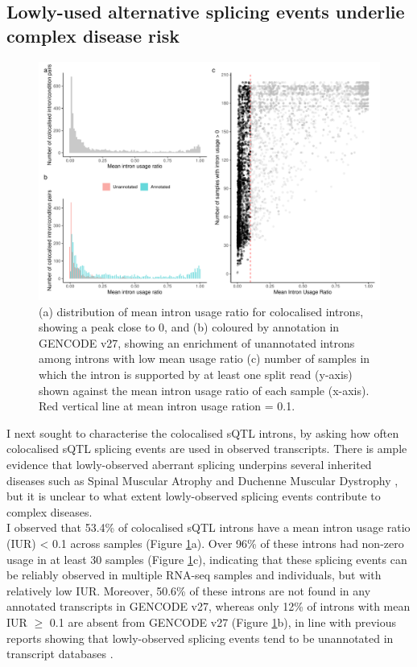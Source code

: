 \subsection{Lowly-used alternative splicing events underlie complex disease risk}
\begin{figure}[H]
  \centering
  \includegraphics[width=\textwidth]{low_sj}
  \caption{(a) distribution of mean intron usage ratio for colocalised introns, showing a peak close to 0, and (b) coloured by annotation in GENCODE v27, showing an enrichment of unannotated introns among introns with low mean usage ratio (c) number of samples in which the intron is supported by at least one split read (y-axis) shown against the mean intron usage ratio of each sample (x-axis). Red vertical line at mean intron usage ration  = 0.1.}
  \label{fig:low_sj}   
\end{figure}
I next sought to characterise the colocalised sQTL introns, by asking how often colocalised sQTL splicing events are used in observed transcripts. There is ample evidence that lowly-observed aberrant splicing underpins several inherited diseases such as Spinal Muscular Atrophy and Duchenne Muscular Dystrophy \cite{Symoens2011-ew,Abramowicz2018-by,Sanz2017-re}, but it is unclear to what extent lowly-observed splicing events contribute to complex diseases. \\

I observed that 53.4\% of colocalised sQTL introns have a mean intron usage ratio (IUR) < 0.1 across samples (Figure \ref{fig:low_sj}a). Over 96\% of these introns had non-zero usage in at least 30 samples (Figure \ref{fig:low_sj}c), indicating that these splicing events can be reliably observed in multiple RNA-seq samples and individuals, but with relatively low IUR. Moreover, 50.6\% of these introns are not found in any annotated transcripts in GENCODE v27, whereas only 12\% of introns with mean IUR $\geq$ 0.1 are absent from GENCODE v27 (Figure \ref{fig:low_sj}b), in line with previous reports showing that lowly-observed splicing events tend to be unannotated in transcript databases \cite{Nellore2016-fj,Pickrell2010-lz}. \\

